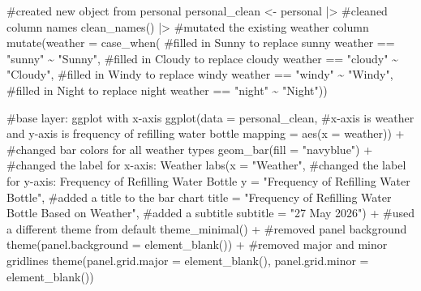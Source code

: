 \documentclass[
  letterpaper,
  DIV=11,
  numbers=noendperiod]{scrartcl}
\newenvironment{Shaded}{\begin{snugshade}}{\end{snugshade}}
\newcommand{\AttributeTok}[1]{\textcolor[rgb]{0.40,0.45,0.13}{#1}}
\newcommand{\CommentTok}[1]{\textcolor[rgb]{0.37,0.37,0.37}{#1}}
\newcommand{\FunctionTok}[1]{\textcolor[rgb]{0.28,0.35,0.67}{#1}}
\newcommand{\NormalTok}[1]{\textcolor[rgb]{0.00,0.23,0.31}{#1}}
\newcommand{\OtherTok}[1]{\textcolor[rgb]{0.00,0.23,0.31}{#1}}
\newcommand{\SpecialCharTok}[1]{\textcolor[rgb]{0.37,0.37,0.37}{#1}}
\newcommand{\StringTok}[1]{\textcolor[rgb]{0.13,0.47,0.30}{#1}}
\begin{document}
\begin{Shaded}
\begin{Highlighting}[]
\CommentTok{\#created new object from personal}
\NormalTok{personal\_clean }\OtherTok{\textless{}{-}}\NormalTok{ personal }\SpecialCharTok{|\textgreater{}}
\CommentTok{\#cleaned column names    }
  \FunctionTok{clean\_names}\NormalTok{() }\SpecialCharTok{|\textgreater{}} 
\CommentTok{\#mutated the existing weather column  }
  \FunctionTok{mutate}\NormalTok{(}\AttributeTok{weather =} \FunctionTok{case\_when}\NormalTok{(}
\CommentTok{\#filled in Sunny to replace sunny    }
\NormalTok{    weather }\SpecialCharTok{==} \StringTok{"sunny"}  \SpecialCharTok{\textasciitilde{}} \StringTok{"Sunny"}\NormalTok{,}
\CommentTok{\#filled in Cloudy to replace cloudy    }
\NormalTok{    weather }\SpecialCharTok{==} \StringTok{"cloudy"} \SpecialCharTok{\textasciitilde{}} \StringTok{"Cloudy"}\NormalTok{,}
\CommentTok{\#filled in Windy to replace windy    }
\NormalTok{    weather }\SpecialCharTok{==} \StringTok{"windy"}  \SpecialCharTok{\textasciitilde{}} \StringTok{"Windy"}\NormalTok{,}
\CommentTok{\#filled in Night to replace night    }
\NormalTok{    weather }\SpecialCharTok{==} \StringTok{"night"}  \SpecialCharTok{\textasciitilde{}} \StringTok{"Night"}\NormalTok{))}
\end{Highlighting}
\end{Shaded}

\begin{Shaded}
\begin{Highlighting}[]
\CommentTok{\#base layer: ggplot with x{-}axis}
\FunctionTok{ggplot}\NormalTok{(}\AttributeTok{data =}\NormalTok{ personal\_clean, }
\CommentTok{\#x{-}axis is weather and y{-}axis is frequency of refilling water bottle       }
       \AttributeTok{mapping =} \FunctionTok{aes}\NormalTok{(}\AttributeTok{x =}\NormalTok{ weather)) }\SpecialCharTok{+}
\CommentTok{\#changed bar colors for all weather types   }
  \FunctionTok{geom\_bar}\NormalTok{(}\AttributeTok{fill =} \StringTok{"navyblue"}\NormalTok{) }\SpecialCharTok{+}
\CommentTok{\#changed the label for x{-}axis: Weather }
  \FunctionTok{labs}\NormalTok{(}\AttributeTok{x =} \StringTok{"Weather"}\NormalTok{,}
\CommentTok{\#changed the label for y{-}axis: Frequency of Refilling Water Bottle        }
       \AttributeTok{y =} \StringTok{"Frequency of Refilling Water Bottle"}\NormalTok{,}
\CommentTok{\#added a title to the bar chart        }
       \AttributeTok{title =} \StringTok{"Frequency of Refilling Water Bottle Based on Weather"}\NormalTok{,}
\CommentTok{\#added a subtitle}
\AttributeTok{subtitle =} \StringTok{"27 May 2026"}\NormalTok{) }\SpecialCharTok{+}
\CommentTok{\#used a different theme from default  }
  \FunctionTok{theme\_minimal}\NormalTok{() }\SpecialCharTok{+}
\CommentTok{\#removed panel background  }
  \FunctionTok{theme}\NormalTok{(}\AttributeTok{panel.background =} \FunctionTok{element\_blank}\NormalTok{()) }\SpecialCharTok{+} 
\CommentTok{\#removed major and minor gridlines   }
  \FunctionTok{theme}\NormalTok{(}\AttributeTok{panel.grid.major =} \FunctionTok{element\_blank}\NormalTok{(),}
        \AttributeTok{panel.grid.minor =} \FunctionTok{element\_blank}\NormalTok{()) }
\end{Highlighting}
\end{Shaded}
\end{document}
